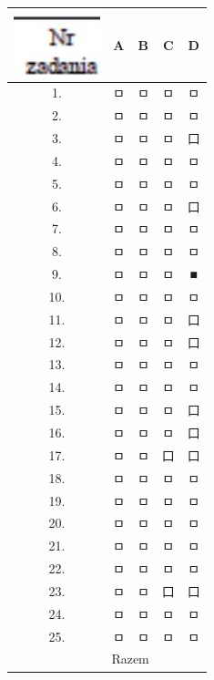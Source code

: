\documentclass[10pt]{article}
\begin{document}
\begin{center}
\begin{tabular}{|c|c|c|c|c|}
\hline
\includegraphics[max width=\textwidth]{2024_11_21_e376e4ee4a8b7ab03731g-16}
 & A & B & C & D \\
\hline
1. & ㅁ & ㅁ & ㅁ & ㅁ \\
\hline
2. & ㅁ & ㅁ & ㅁ & ㅁ \\
\hline
3. & ㅁ & ㅁ & ㅁ & 口 \\
\hline
4. & ㅁ & ㅁ & ㅁ & ㅁ \\
\hline
5. & ㅁ & ㅁ & ㅁ & ㅁ \\
\hline
6. & ㅁ & ㅁ & ㅁ & 口 \\
\hline
7. & ㅁ & ㅁ & ㅁ & ㅁ \\
\hline
8. & ㅁ & ㅁ & ㅁ & ㅁ \\
\hline
9. & ㅁ & ㅁ & ㅁ & ■ \\
\hline
10. & ㅁ & ㅁ & ㅁ & ㅁ \\
\hline
11. & ㅁ & ㅁ & ㅁ & 口 \\
\hline
12. & ㅁ & ㅁ & ㅁ & 口 \\
\hline
13. & ㅁ & ㅁ & ㅁ & ㅁ \\
\hline
14. & ㅁ & ㅁ & ㅁ & ㅁ \\
\hline
15. & ㅁ & ㅁ & ㅁ & 口 \\
\hline
16. & ㅁ & ㅁ & ㅁ & 口 \\
\hline
17. & ㅁ & ㅁ & 口 & 口 \\
\hline
18. & ㅁ & ㅁ & ㅁ & ㅁ \\
\hline
19. & ㅁ & ㅁ & ㅁ & ㅁ \\
\hline
20. & ㅁ & ㅁ & ㅁ & ㅁ \\
\hline
21. & ㅁ & ㅁ & ㅁ & ㅁ \\
\hline
22. & ㅁ & ㅁ & ㅁ & ㅁ \\
\hline
23. & ㅁ & ㅁ & 口 & 口 \\
\hline
24. & ㅁ & ㅁ & ㅁ & ㅁ \\
\hline
25. & ㅁ & ㅁ & ㅁ & ㅁ \\
\hline
\multicolumn{3}{|r|}{Razem} &  &  \\
\hline
\end{tabular}
\end{center}
\end{document}
